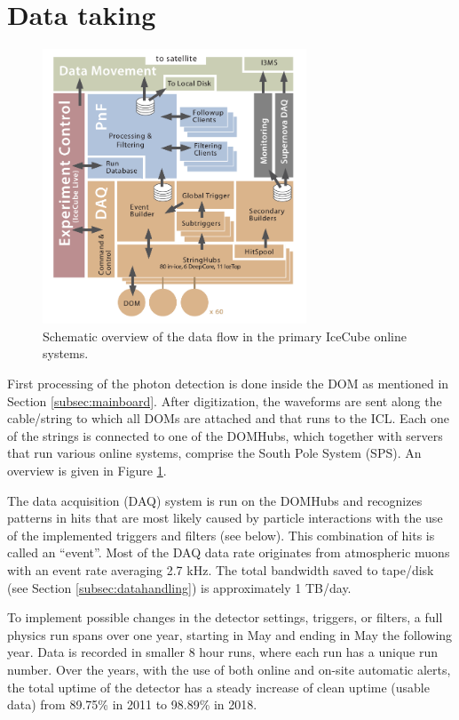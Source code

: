 \section{Data taking}
\label{sec:datataking}

\begin{figure}[t]
\centering
\includegraphics[width=0.7\textwidth]{chapter5/img/dataflow.png}
\caption{Schematic overview of the data flow in the primary IceCube online systems.}
\label{fig:dataflow}
\end{figure}
First processing of the photon detection is done inside the DOM as mentioned in Section \ref{subsec:mainboard}. After digitization, the waveforms are sent along the cable/string to which all DOMs are attached and that runs to the ICL. Each one of the strings is connected to one of the DOMHubs, which together with servers that run various online systems, comprise the South Pole System (SPS). An overview is given in Figure \ref{fig:dataflow}.

The data acquisition (DAQ) system is run on the DOMHubs and recognizes patterns in hits that are most likely caused by particle interactions with the use of the implemented triggers and filters (see below). This combination of hits is called an ``event''. Most of the DAQ data rate originates from atmospheric muons with an event rate averaging 2.7 kHz. The total bandwidth saved to tape/disk (see Section \ref{subsec:datahandling}) is approximately 1 TB/day.

To implement possible changes in the detector settings, triggers, or filters, a full physics run spans over one year, starting in May and ending in May the following year. Data is recorded in smaller 8 hour runs, where each run has a unique run number. Over the years, with the use of both online and on-site automatic alerts, the total uptime of the detector has a steady increase of clean uptime (usable data) from 89.75\% in 2011 to 98.89\% in 2018.

